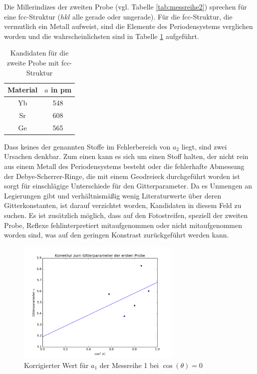 \noindent
Die Millerindizes der zweiten Probe (vgl. Tabelle \ref{tab:messreihe2}) sprechen für eine fcc-Struktur ($hkl$ alle gerade oder ungerade).
Für die fcc-Struktur, die vermutlich ein Metall aufweist, sind die Elemente des Periodensystems verglichen worden und die wahrscheinlichsten sind in 
Tabelle \ref{tab:matProb2} aufgeführt.

\begin{table}[H]
 \begin{tabular}{cc}
Material &$a$ in pm\\
\hline
Yb& 548\\
Sr & 608\\
Ge & 565\\
  
 \end{tabular}
 \caption{Kandidaten für die zweite Probe mit fcc-Struktur}
 \label{tab:matProb2}

\end{table}
\noindent Dass keines der genannten Stoffe im Fehlerbereich von $a_2$ liegt, sind zwei Ursachen denkbar. Zum einen kann es sich um einen Stoff halten, der nicht
rein aus einem Metall des Periodensystems besteht oder die fehlerhafte Abmessung der Debye-Scherrer-Ringe, die mit einem Geodreieck durchgeführt worden ist
sorgt für einschlägige Unterschiede für den Gitterparameter. Da es Unmengen an Legierungen gibt und verhältnismäßig wenig Literaturwerte über deren
Gitterkonstanten, ist darauf verzichtet worden, Kandidaten in diesem Feld zu suchen. Es ist zusätzlich möglich, dass auf den Fotostreifen, speziell
der zweiten Probe, Reflexe fehlinterpretiert mitaufgenommen oder nicht mitaufgenommen worden sind, was auf den geringen Konstrast zurückgeführt werden kann.

\begin{figure}[h]
 \includegraphics[width=0.7\textwidth]{../auswertung/a1.png}
 \caption{Korrigierter Wert für $a_1$ der Messreihe 1 bei $\cos(\theta)=0$}
 \label{pic:fita1}
\end{figure}

